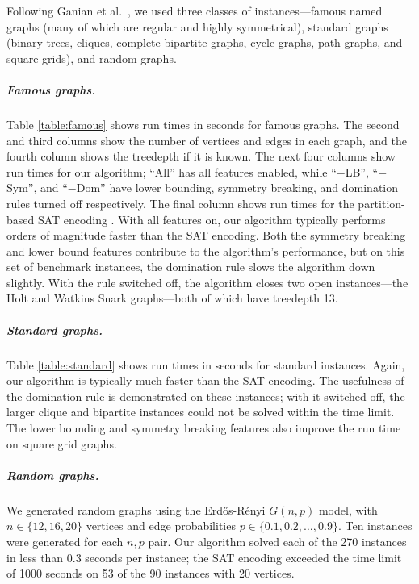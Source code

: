 {    Following Ganian et al.\ \cite{DBLP:conf/alenex/GanianLOS19,DBLP:journals/corr/abs-1911-12995}, we used three classes of instances---famous
    named graphs (many of which are regular and highly symmetrical), standard graphs (binary trees,
    cliques, complete bipartite graphs, cycle graphs, path graphs, and square grids), and random graphs.

    

    \subparagraph*{Famous graphs.}
    Table \ref{table:famous} shows run times in seconds for famous graphs. 
    The second and third columns show the number of vertices and edges in each graph, and the fourth
    column shows the treedepth if it is known.  The next
    four columns show run times for our algorithm; ``All'' has all features enabled, while
    ``$-$LB'', ``$-$Sym'', and ``$-$Dom'' have lower bounding, symmetry breaking, and domination rules
    turned off respectively.  The final column shows run times for the partition-based SAT encoding
    \cite{DBLP:conf/alenex/GanianLOS19,DBLP:journals/corr/abs-1911-12995}.  With all features on, our algorithm typically performs orders
    of magnitude faster than the SAT encoding.  Both the symmetry breaking and lower bound
    features contribute to the algorithm's performance, but on this set of benchmark instances, the domination
    rule slows the algorithm down slightly.  With
    the rule switched off, the algorithm closes two open instances---the Holt and Watkins Snark graphs---both
    of which have treedepth 13.

    \subparagraph*{Standard graphs.}
    Table \ref{table:standard} shows run times in seconds for standard instances.
    Again, our algorithm is typically much faster than the SAT encoding.  The
    usefulness of the domination rule is demonstrated on these instances; with it
    switched off, the larger clique and bipartite instances could not be solved
    within the time limit.  The lower bounding and symmetry breaking features also
    improve the run time on square grid graphs.

    

    \subparagraph*{Random graphs.}
    We generated random graphs using the Erd\H{o}s-Rényi $G(n,p)$ model, with
    $n \in \{12, 16, 20\}$ vertices and edge probabilities
    $p \in \{0.1, 0.2, \dots, 0.9\}$.  Ten instances were generated for each $n,p$ pair.
    Our algorithm solved each of the 270 instances in less than 0.3 seconds per instance; the SAT
    encoding exceeded the time limit of 1000 seconds on 53 of the 90 instances with 20 vertices.

}
